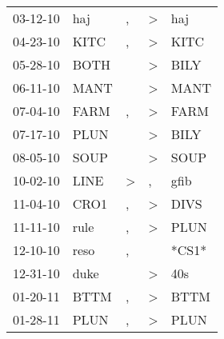 \begin{supertabular}{p{0.07\textwidth}p{0.06\textwidth}p{0.02\textwidth}p{0.02\textwidth}p{0.06\textwidth}}
          03-12-10\textsuperscript{} &            haj\textsuperscript{} &                , &     \textgreater &            haj\textsuperscript{} \\
          04-23-10\textsuperscript{} &           KITC\textsuperscript{} &                , &     \textgreater &           KITC\textsuperscript{} \\
          05-28-10\textsuperscript{} &           BOTH\textsuperscript{} &                  &     \textgreater &           BILY\textsuperscript{} \\
          06-11-10\textsuperscript{} &           MANT\textsuperscript{} &                  &     \textgreater &           MANT\textsuperscript{} \\
          07-04-10\textsuperscript{} &           FARM\textsuperscript{} &                , &     \textgreater &           FARM\textsuperscript{} \\
          07-17-10\textsuperscript{} &           PLUN\textsuperscript{} &                  &     \textgreater &           BILY\textsuperscript{} \\
          08-05-10\textsuperscript{} &           SOUP\textsuperscript{} &                  &     \textgreater &           SOUP\textsuperscript{} \\
          10-02-10\textsuperscript{} &           LINE\textsuperscript{} &     \textgreater &                , &           gfib\textsuperscript{} \\
          11-04-10\textsuperscript{} &           CRO1\textsuperscript{} &                , &     \textgreater &           DIVS\textsuperscript{} \\
          11-11-10\textsuperscript{} &           rule\textsuperscript{} &                , &     \textgreater &           PLUN\textsuperscript{} \\
          12-10-10\textsuperscript{} &           reso\textsuperscript{} &                , &                  &                            *CS1* \\
          12-31-10\textsuperscript{} &           duke\textsuperscript{} &                  &     \textgreater &            40s\textsuperscript{} \\
          01-20-11\textsuperscript{} &           BTTM\textsuperscript{} &                , &     \textgreater &           BTTM\textsuperscript{} \\
          01-28-11\textsuperscript{} &           PLUN\textsuperscript{} &                , &     \textgreater &           PLUN\textsuperscript{} \\

\end{supertabular}
